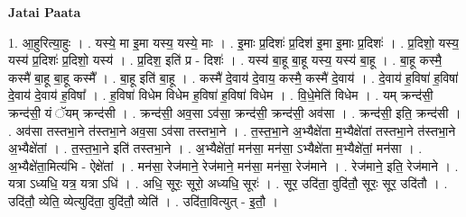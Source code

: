 \documentclass[17pt]{extarticle}
\begin{document}
\textbf{Jatai Paata} \newline

1. आ॒हुरित्या॒हुः । . यस्ये॒ मा इ॒मा यस्य॒ यस्ये॒ माः । . इ॒माः प्र॒दिशः॑ प्र॒दिश॑ इ॒मा इ॒माः प्र॒दिशः॑ । . प्र॒दिशो॒ यस्य॒ यस्य॑ प्र॒दिशः॑ प्र॒दिशो॒ यस्य॑ । . प्र॒दिश॒ इति॑ प्र - दिशः॑ । . यस्य॑ बा॒हू बा॒हू यस्य॒ यस्य॑ बा॒हू । . बा॒हू कस्मै॒ कस्मै॑ बा॒हू बा॒हू कस्मै᳚ । . बा॒हू इति॑ बा॒हू । . कस्मै॑ दे॒वाय॑ दे॒वाय॒ कस्मै॒ कस्मै॑ दे॒वाय॑ । . दे॒वाय॑ ह॒विषा॑ ह॒विषा॑ दे॒वाय॑ दे॒वाय॑ ह॒विषा᳚ । . ह॒विषा॑ विधेम विधेम ह॒विषा॑ ह॒विषा॑ विधेम । . वि॒धे॒मेति॑ विधेम । . यम् क्रन्द॑सी॒ क्रन्द॑सी॒ यं ॅयम् क्रन्द॑सी । . क्रन्द॑सी॒ अव॒सा ऽव॑सा॒ क्रन्द॑सी॒ क्रन्द॑सी॒ अव॑सा । . क्रन्द॑सी॒ इति॒ क्रन्द॑सी । . अव॑सा तस्तभा॒ने त॑स्तभा॒ने अव॒सा ऽव॑सा तस्तभा॒ने । . त॒स्त॒भा॒ने अ॒भ्यैक्षे॑ता म॒भ्यैक्षे॑तां तस्तभा॒ने त॑स्तभा॒ने अ॒भ्यैक्षे॑तां । . त॒स्त॒भा॒ने इति॑ तस्तभा॒ने । . अ॒भ्यैक्षे॑तां॒ मन॑सा॒ मन॑सा॒ ऽभ्यैक्षे॑ता म॒भ्यैक्षे॑तां॒ मन॑सा । . अ॒भ्यैक्षे॑ता॒मित्य॑भि - ऐक्षे॑तां । . मन॑सा॒ रेज॑माने॒ रेज॑माने॒ मन॑सा॒ मन॑सा॒ रेज॑माने । . रेज॑माने॒ इति॒ रेज॑माने । . यत्रा ऽध्यधि॒ यत्र॒ यत्रा ऽधि॑ । . अधि॒ सूरः॒ सूरो॒ अध्यधि॒ सूरः॑ । . सूर॒ उदि॑ता॒ वुदि॑तौ॒ सूरः॒ सूर॒ उदि॑तौ । . उदि॑तौ॒ व्येति॒ व्येत्युदि॑ता॒ वुदि॑तौ॒ व्येति॑ । . उदि॑ता॒वित्युत् - इ॒तौ॒ । \newline
\end{document}
